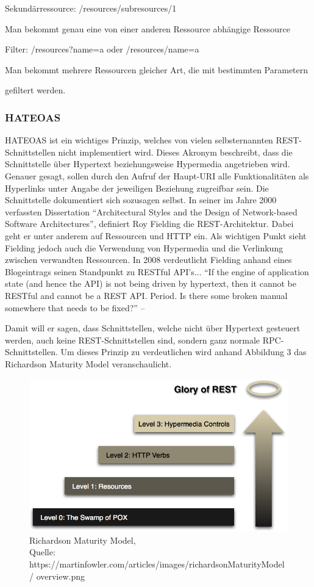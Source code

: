 Sekundärressource: /resources/subresources/1

Man bekommt genau eine von einer anderen Ressource abhängige Ressource

Filter: /resources?name=a oder /resources/name=a

Man bekommt mehrere Ressourcen gleicher Art, die mit bestimmten Parametern

gefiltert werden.

\subsubsection{HATEOAS}
\label{sec:RESTHATEOAS}

HATEOAS ist ein wichtiges Prinzip, welches von vielen selbsternannten REST-Schnittstellen
nicht implementiert wird. Dieses Akronym beschreibt, dass die Schnittstelle über Hypertext
beziehungsweise Hypermedia angetrieben wird. Genauer gesagt, sollen durch den Aufruf
der Haupt-URI alle Funktionalitäten als Hyperlinks unter Angabe der jeweiligen Beziehung
zugreifbar sein. Die Schnittstelle dokumentiert sich sozusagen selbst.
In seiner im Jahre 2000 verfassten Dissertation “Architectural Styles and the Design of
Network-based Software Architectures”, definiert Roy Fielding die REST-Architektur. Dabei
geht er unter anderem auf Ressourcen und HTTP ein. Als wichtigen Punkt sieht Fielding
jedoch auch die Verwendung von Hypermedia und die Verlinkung zwischen verwandten Ressourcen.
In 2008 verdeutlicht Fielding anhand eines Blogeintrags seinen Standpunkt zu RESTful API’s...
“If the engine of application state (and hence the API) is not being driven by hypertext, then
it cannot be RESTful and cannot be a REST API. Period. Is there some broken manual
somewhere that needs to be fixed?” – \cite{.19.03.2017}

Damit will er sagen, dass Schnittstellen, welche nicht über Hypertext gesteuert werden, auch
keine REST-Schnittstellen sind, sondern ganz normale RPC-Schnittstellen.
Um dieses Prinzip zu verdeutlichen wird anhand Abbildung 3 das Richardson Maturity Model
veranschaulicht.
 
\begin{figure}[!htb]
	\centering
	\includegraphics[scale=0.5]{hateoas.png}
	\caption[Richardson Maturity Model]{Richardson Maturity Model,\\ Quelle: https://martinfowler.com/articles/images/richardsonMaturityModel/ overview.png}
\end{figure}
 



